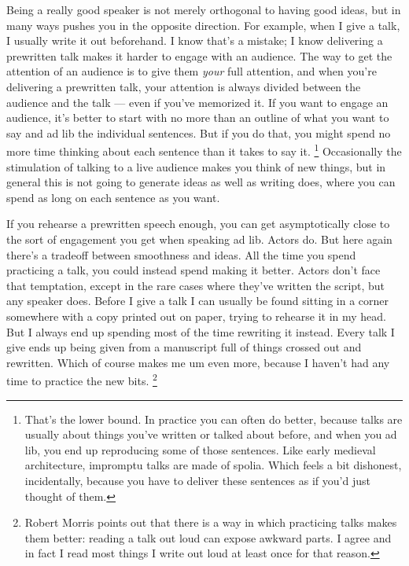 \documentclass[12pt]{book}
\begin{document}
Being a really good speaker is not merely orthogonal to having good
ideas, but in many ways pushes you in the opposite direction. For
example, when I give a talk, I usually write it out beforehand. I know
that's a mistake; I know delivering a prewritten talk makes it harder to
engage with an audience. The way to get the attention of an audience is
to give them \emph{your} full attention, and when you're delivering a
prewritten talk, your attention is always divided between the audience
and the talk --- even if you've memorized it. If you want to engage an
audience, it's better to start with no more than an outline of what you
want to say and ad lib the individual sentences. But if you do that, you
might spend no more time thinking about each sentence than it takes to
say it. \footnote{That's the lower bound. In practice you can often do better,
because talks are usually about things you've written or talked about
before, and when you ad lib, you end up reproducing some of those
sentences. Like early medieval architecture, impromptu talks are made of
spolia. Which feels a bit dishonest, incidentally, because you have to
deliver these sentences as if you'd just thought of them.} Occasionally the stimulation of talking
to a live audience makes you think of new things, but in general this is
not going to generate ideas as well as writing does, where you can spend
as long on each sentence as you want.

If you rehearse a prewritten speech enough, you can get asymptotically
close to the sort of engagement you get when speaking ad lib. Actors do.
But here again there's a tradeoff between smoothness and ideas. All the
time you spend practicing a talk, you could instead spend making it
better. Actors don't face that temptation, except in the rare cases
where they've written the script, but any speaker does. Before I give a
talk I can usually be found sitting in a corner somewhere with a copy
printed out on paper, trying to rehearse it in my head. But I always end
up spending most of the time rewriting it instead. Every talk I give
ends up being given from a manuscript full of things crossed out and
rewritten. Which of course makes me um even more, because I haven't had
any time to practice the new bits. \footnote{Robert Morris points out that there is a way in which practicing
talks makes them better: reading a talk out loud can expose awkward
parts. I agree and in fact I read most things I write out loud at least
once for that reason.}
\end{document}
